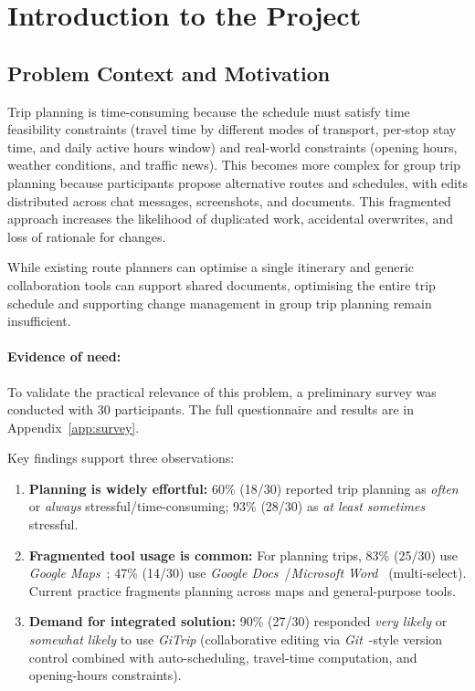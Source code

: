 \section{Introduction to the Project}

\subsection{Problem Context and Motivation}
Trip planning is time-consuming because the schedule must satisfy time feasibility constraints (travel time by different modes of transport, per-stop stay time, and daily active hours window) and real-world constraints (opening hours, weather conditions, and traffic news). This becomes more complex for group trip planning because participants propose alternative routes and schedules, with edits distributed across chat messages, screenshots, and documents. This fragmented approach increases the likelihood of duplicated work, accidental overwrites, and loss of rationale for changes.

While existing route planners can optimise a single itinerary and generic collaboration tools can support shared documents, optimising the entire trip schedule and supporting change management in group trip planning remain insufficient.

\paragraph{Evidence of need:}
To validate the practical relevance of this problem, a preliminary survey was conducted with 30 participants. The full questionnaire and results are in Appendix~\ref{app:survey}.

Key findings support three observations:
\begin{enumerate}
  \item \textbf{Planning is widely effortful:} 60\% (18/30) reported trip planning as \emph{often} or \emph{always} stressful/time-consuming; 93\% (28/30) as \emph{at least sometimes} stressful.
  \item \textbf{Fragmented tool usage is common:} For planning trips, 83\% (25/30) use \textit{Google Maps}~\cite{google-maps}; 47\% (14/30) use \textit{Google Docs}~\cite{google-docs}/\textit{Microsoft Word}~\cite{microsoft-word} (multi-select). Current practice fragments planning across maps and general-purpose tools.
  \item \textbf{Demand for integrated solution:} 90\% (27/30) responded \emph{very likely} or \emph{somewhat likely} to use \textit{GiTrip} (collaborative editing via \textit{Git}~\cite{git}-style version control combined with auto-scheduling, travel-time computation, and opening-hours constraints).
\end{enumerate}


